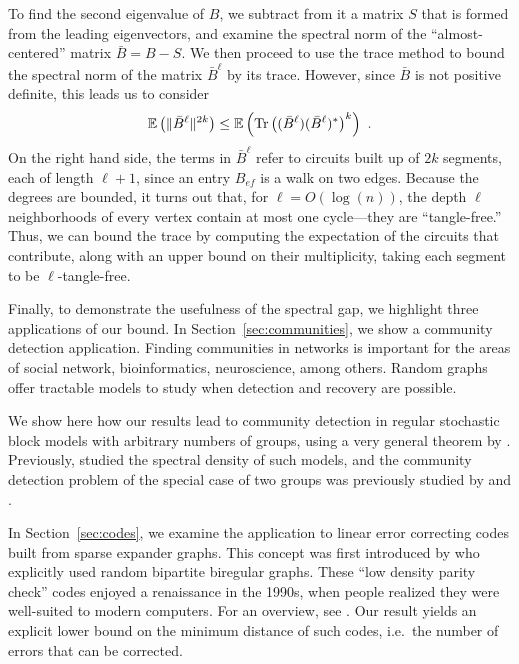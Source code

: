 To find the second eigenvalue of $B$,
we subtract from it a matrix $S$ that is formed from the leading eigenvectors,
and examine the spectral norm of the 
``almost-centered'' matrix $\bar{B} = B - S$.
We then proceed to use the trace method to bound 
the spectral norm of the matrix $\bar{B}^\ell$ by its trace.
However, since $\bar{B}$ is not positive definite, this leads us to consider
\[
\mathbb{E}\left(\|\bar{B}^{\ell}\|^{2k}\right)
\leq 
\mathbb{E}\left( \mathrm{Tr} \left( (\bar{B}^{\ell}) (\bar{B}^{\ell})^* \right)^{k} \right)~.
\]
On the right hand side, the terms in $\bar{B}^\ell$ refer to circuits built up of
$2k$ segments, each of length $\ell+1$,
since an entry $B_{ef}$ is a walk on two edges.
Because the degrees are bounded, it turns out that, for $\ell = O(\log (n))$,
the depth $\ell$ neighborhoods of every vertex contain at most one cycle---they are ``tangle-free.''
Thus, we can bound the trace by computing the expectation of the circuits that contribute,
along with an upper bound on their multiplicity, 
taking each segment to be $\ell$-tangle-free.

Finally, to demonstrate the usefulness of the spectral gap,
we highlight three applications of our bound.
In Section~\ref{sec:communities}, we show a community detection application. 
Finding communities in networks is important
for the areas of social network, bioinformatics,
neuroscience, among others.
Random graphs offer tractable models to study when detection and 
recovery are possible. 

We show here how our results lead to 
community detection in regular stochastic block models with 
arbitrary numbers of groups, using a very general theorem by
\citet*{wan2015}. 
Previously, \citet*{newman2014} studied the spectral density of such models,
and the community detection problem of the special case of 
two groups was previously studied by \citet*{brito2015} and \citet*{barucca2017}.

In Section~\ref{sec:codes}, 
we examine the application to linear
error correcting codes built from sparse expander graphs.
This concept was first introduced by \citet*{gallager1962}
who explicitly used random bipartite biregular graphs.
These ``low density parity check'' codes
enjoyed a renaissance in the 1990s, 
when people realized they were well-suited to modern computers.
For an overview, see \citet*{richardson2003,richardson2008}.
Our result yields an explicit lower bound on the minimum distance
of such codes, i.e.\ the number of errors that can be corrected.

